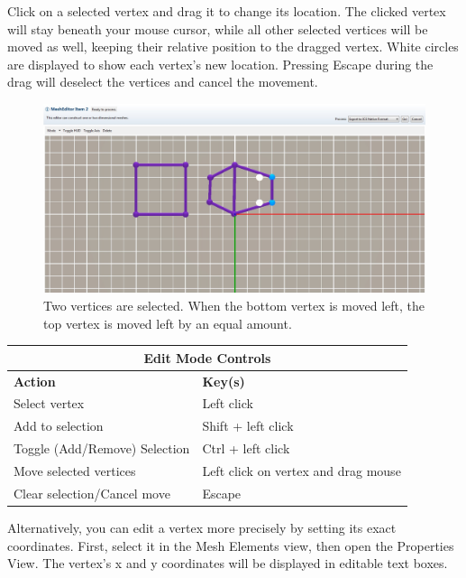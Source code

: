 \documentclass{article}
\begin{document}
Click on a selected vertex and drag it to change its location. The clicked
vertex will stay beneath your mouse cursor, while all other selected vertices
will be moved as well, keeping their relative position to the dragged vertex.
White circles are displayed to show each vertex's new location. Pressing Escape
during the drag will deselect the vertices and cancel the movement.

\begin{figure}
\begin{center}
\includegraphics[width=12cm]{images/MeshEditorDragVertex}
\caption{Two vertices are selected. When the bottom vertex is moved left, the
top vertex is moved left by an equal amount.}
\end{center}
\end{figure}

\begin{center}
    \begin{tabular}{| l | l |}
    \hline
    \multicolumn{2}{|c|}{\textbf{Edit Mode Controls}} \\
  	\hline
    \textbf{Action} & \textbf{Key(s)} \\ \hline
    Select vertex & Left click \\ \hline
    Add to selection & Shift + left click \\ \hline
    Toggle (Add/Remove) Selection & Ctrl + left click \\ \hline
    Move selected vertices & Left click on vertex and drag mouse \\ \hline
    Clear selection/Cancel move & Escape \\ 
    \hline
    \end{tabular}
\end{center}

Alternatively, you can edit a vertex more precisely by setting its exact
coordinates. First, select it in the Mesh Elements view, then open the
Properties View. The vertex's x and y coordinates will be displayed in editable
text boxes.
\end{document}
